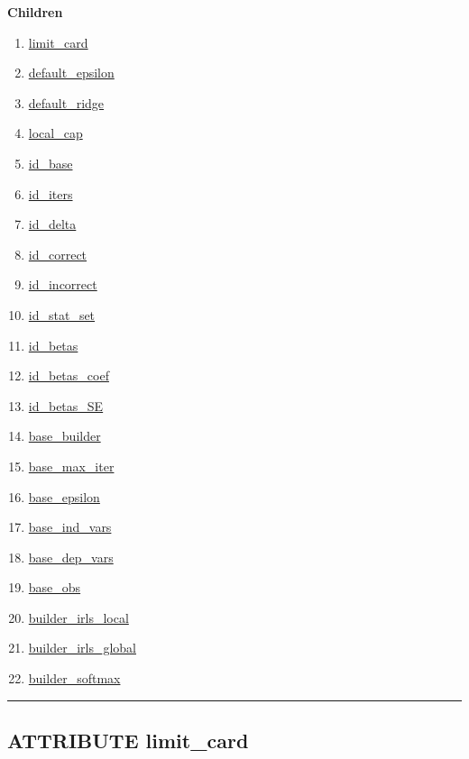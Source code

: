 \textbf{Children}
\begin{enumerate}
\item \hyperlink{ecldoc:constants.limit_card}{limit\_card}
\item \hyperlink{ecldoc:constants.default_epsilon}{default\_epsilon}
\item \hyperlink{ecldoc:constants.default_ridge}{default\_ridge}
\item \hyperlink{ecldoc:constants.local_cap}{local\_cap}
\item \hyperlink{ecldoc:constants.id_base}{id\_base}
\item \hyperlink{ecldoc:constants.id_iters}{id\_iters}
\item \hyperlink{ecldoc:constants.id_delta}{id\_delta}
\item \hyperlink{ecldoc:constants.id_correct}{id\_correct}
\item \hyperlink{ecldoc:constants.id_incorrect}{id\_incorrect}
\item \hyperlink{ecldoc:constants.id_stat_set}{id\_stat\_set}
\item \hyperlink{ecldoc:constants.id_betas}{id\_betas}
\item \hyperlink{ecldoc:constants.id_betas_coef}{id\_betas\_coef}
\item \hyperlink{ecldoc:constants.id_betas_se}{id\_betas\_SE}
\item \hyperlink{ecldoc:constants.base_builder}{base\_builder}
\item \hyperlink{ecldoc:constants.base_max_iter}{base\_max\_iter}
\item \hyperlink{ecldoc:constants.base_epsilon}{base\_epsilon}
\item \hyperlink{ecldoc:constants.base_ind_vars}{base\_ind\_vars}
\item \hyperlink{ecldoc:constants.base_dep_vars}{base\_dep\_vars}
\item \hyperlink{ecldoc:constants.base_obs}{base\_obs}
\item \hyperlink{ecldoc:constants.builder_irls_local}{builder\_irls\_local}
\item \hyperlink{ecldoc:constants.builder_irls_global}{builder\_irls\_global}
\item \hyperlink{ecldoc:constants.builder_softmax}{builder\_softmax}
\end{enumerate}

\rule{\linewidth}{0.5pt}

\subsection*{\textsf{\colorbox{headtoc}{\color{white} ATTRIBUTE}
limit\_card}}


